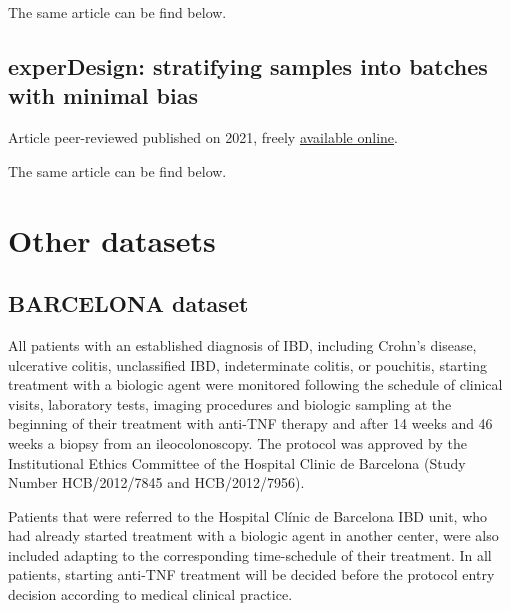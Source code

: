 \documentclass[
  12pt,
  a4paper,
  twoside,
  openright]{book}
\begin{document}
The same article can be find below.



\hypertarget{app-experDesign}{%
\section{experDesign: stratifying samples into batches with minimal bias}\label{app-experDesign}}


Article peer-reviewed published on 2021, freely \href{https://joss.theoj.org/papers/10.21105/joss.03358}{available online}.

The same article can be find below.



\hypertarget{other-datasets}{%
\chapter{Other datasets}\label{other-datasets}}

\hypertarget{barcelona}{%
\section{BARCELONA dataset}\label{barcelona}}

All patients with an established diagnosis of IBD, including Crohn's disease, ulcerative colitis, unclassified IBD, indeterminate colitis, or pouchitis, starting treatment with a biologic agent were monitored following the schedule of clinical visits, laboratory tests, imaging procedures and biologic sampling at the beginning of their treatment with anti-TNF therapy and after 14 weeks and 46 weeks a biopsy from an ileocolonoscopy.
The protocol was approved by the Institutional Ethics Committee of the Hospital Clinic de Barcelona (Study Number HCB/2012/7845 and HCB/2012/7956).

Patients that were referred to the Hospital Clínic de Barcelona IBD unit, who had already started treatment with a biologic agent in another center, were also included adapting to the corresponding time-schedule of their treatment.
In all patients, starting anti-TNF treatment will be decided before the protocol entry decision according to medical clinical practice.
\end{document}
